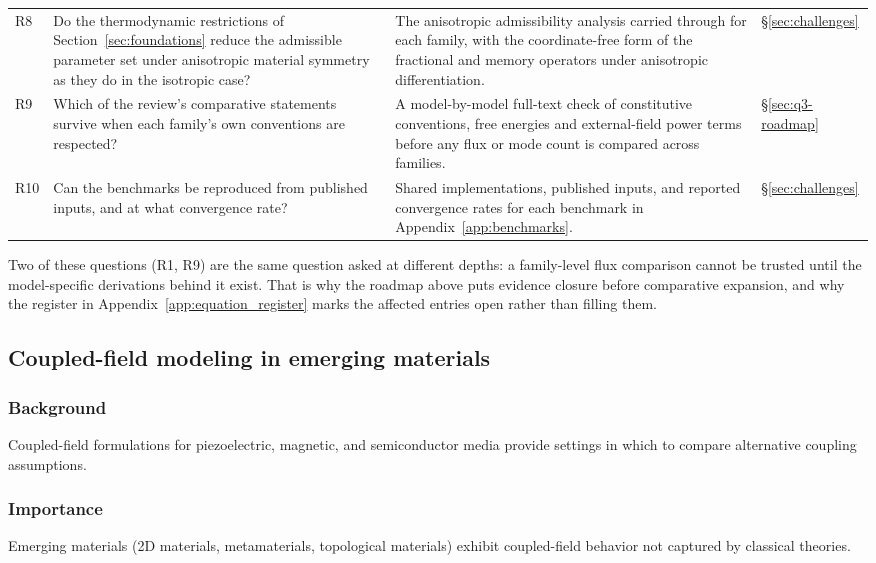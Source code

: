 \begin{table}[H]
\begin{tabularx}{\textwidth}{@{}p{0.55cm}Y Y p{1.9cm}@{}}
R8 & Do the thermodynamic restrictions of Section~\ref{sec:foundations} reduce the admissible parameter set under anisotropic material symmetry as they do in the isotropic case? & The anisotropic admissibility analysis carried through for each family, with the coordinate-free form of the fractional and memory operators under anisotropic differentiation. & \S\ref{sec:challenges} \\
R9 & Which of the review's comparative statements survive when each family's own conventions are respected? & A model-by-model full-text check of constitutive conventions, free energies and external-field power terms before any flux or mode count is compared across families. & \S\ref{sec:q3-roadmap} \\
R10 & Can the benchmarks be reproduced from published inputs, and at what convergence rate? & Shared implementations, published inputs, and reported convergence rates for each benchmark in Appendix~\ref{app:benchmarks}. & \S\ref{sec:challenges} \\
\bottomrule
\end{tabularx}
\end{table}

Two of these questions (R1, R9) are the same question asked at different depths: a family-level flux comparison cannot be trusted until the model-specific derivations behind it exist. That is why the roadmap above puts evidence closure before comparative expansion, and why the register in Appendix~\ref{app:equation_register} marks the affected entries open rather than filling them.

\subsection{Coupled-field modeling in emerging materials}
\label{sec:coupled-field-modeling}

\subsubsection{Background}

Coupled-field formulations for piezoelectric, magnetic, and semiconductor media provide settings in which to compare alternative coupling assumptions.

\subsubsection{Importance}

Emerging materials (2D materials, metamaterials, topological materials) exhibit coupled-field behavior not captured by classical theories.

